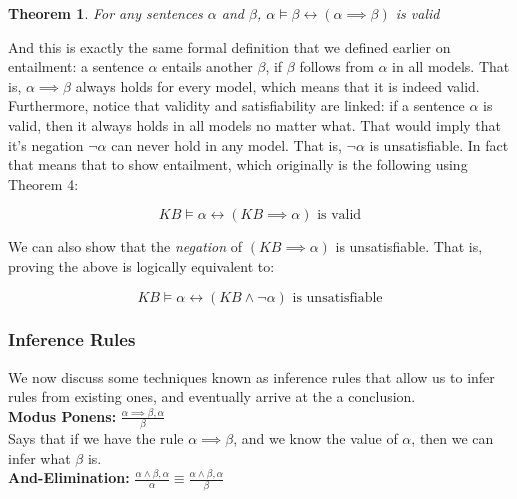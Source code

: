 \documentclass[12pt]{article}
\newtheorem{theorem}{Theorem}
\begin{document}
\begin{theorem}
For any sentences $\alpha$ and $\beta$, $\alpha \models \beta \leftrightarrow (\alpha \implies \beta)$ is valid
\end{theorem}

And this is exactly the same formal definition that we defined earlier on entailment: a sentence $\alpha$ entails another $\beta$, if $\beta$ follows from $\alpha$ in all models. That is, $\alpha \implies \beta$ always holds for every model, which means that it is indeed valid.\\

Furthermore, notice that validity and satisfiability are linked: if a sentence $\alpha$ is valid, then it always holds in all models no matter what. That would imply that it's negation $\lnot \alpha$ can never hold in any model. That is, $\lnot \alpha$ is unsatisfiable. In fact that means that to show entailment, which originally is the following using Theorem 4:

\begin{equation*}
KB \models \alpha \leftrightarrow (KB \implies \alpha) \text{ is valid}
\end{equation*}

We can also show that the \textit{negation} of $(KB \implies \alpha)$ is unsatisfiable. That is, proving the above is logically equivalent to:

\begin{equation*}
KB \models \alpha \leftrightarrow (KB \land \lnot \alpha) \text{ is unsatisfiable}
\end{equation*}

\subsubsection{Inference Rules}

We now discuss some techniques known as inference rules that allow us to infer rules from existing ones, and eventually arrive at the a conclusion.\\

\textbf{Modus Ponens:} $\frac{\alpha \implies \beta, \alpha}{\beta}$\\

Says that if we have the rule $\alpha \implies \beta$, and we know the value of $\alpha$, then we can infer what $\beta$ is.\\

\textbf{And-Elimination:} $\frac{\alpha \land \beta, \alpha}{\alpha} \equiv \frac{\alpha \land \beta, \alpha}{\beta}$\\
\end{document}
